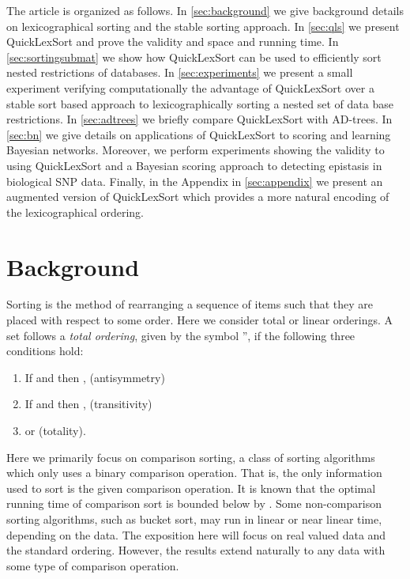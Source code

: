 \documentclass[a4paper,10pt,reqno]{amsart}
\theoremstyle{definition}
\begin{document}
The article is organized as follows. In \autoref{sec:background} we
give background details on lexicographical sorting and the stable sorting
approach. In \autoref{sec:qls} we present QuickLexSort and prove the validity and space and
running time. In \autoref{sec:sortingsubmat} we show how
QuickLexSort can be used to efficiently sort nested restrictions of databases.
In \autoref{sec:experiments} we present a small experiment verifying
computationally the advantage of QuickLexSort over a stable sort based approach
to lexicographically sorting a nested set of data base restrictions. In
\autoref{sec:adtrees} we briefly compare QuickLexSort with AD-trees. In
\autoref{sec:bn} we give details on applications of QuickLexSort to scoring and
learning Bayesian networks.  Moreover, we perform experiments showing the
validity to using QuickLexSort and a Bayesian scoring approach to detecting
epistasis in biological SNP data.  Finally, in the Appendix in \autoref{sec:appendix} we
present an augmented version of QuickLexSort which provides a more natural
encoding of the lexicographical ordering.





\section{Background}
\label{sec:background}
Sorting is the method of rearranging a sequence of items such that they are
placed with respect to some order. Here we consider total or linear orderings.
A set follows a \emph{total ordering}, given by the symbol '', if the following 
three conditions hold:
\begin{enumerate}
    \item If  and  then , (antisymmetry)
    \item If  and  then , (transitivity)
    \item  or  (totality).
\end{enumerate}
Here we primarily focus on comparison sorting, a class of sorting
algorithms which only uses a binary comparison operation. That is, the only
information used to sort is the given comparison operation. It is known that the
optimal running time of comparison sort is bounded below by 
\cite{Cormen:2001fk}. Some non-comparison sorting algorithms, such as bucket
sort, may run in linear or near linear time, depending on the data.
The exposition here will focus on real valued data and the standard ordering.
However, the results extend naturally to any data with some type of comparison
operation.
\end{document}

